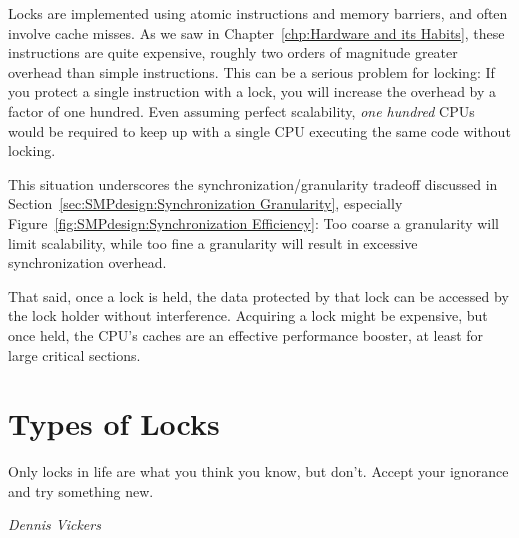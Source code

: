 Locks are implemented using atomic instructions and memory barriers,
and often involve cache misses.
As we saw in Chapter~\ref{chp:Hardware and its Habits},
these instructions are quite expensive, roughly two
orders of magnitude greater overhead than simple instructions.
This can be a serious problem for locking: If you protect a single
instruction with a lock, you will increase the overhead by a factor
of one hundred.
Even assuming perfect scalability, \emph{one hundred} CPUs would
be required to keep up with a single CPU executing the same code
without locking.

This situation underscores the synchronization\-/granularity
tradeoff discussed in Section~\ref{sec:SMPdesign:Synchronization Granularity},
especially Figure~\ref{fig:SMPdesign:Synchronization Efficiency}:
Too coarse a granularity will limit scalability, while too fine a
granularity will result in excessive synchronization overhead.

That said, once a lock is held, the data protected by that lock can
be accessed by the lock holder without interference.
Acquiring a lock might be expensive, but once held, the CPU's caches
are an effective performance booster, at least for large critical sections.

\QuickQuizEnd

\section{Types of Locks}
\label{sec:locking:Types of Locks}
%
\epigraph{Only locks in life are what you think you know, but don't.
	  Accept your ignorance and try something new.}
	 {\emph{Dennis Vickers}}

